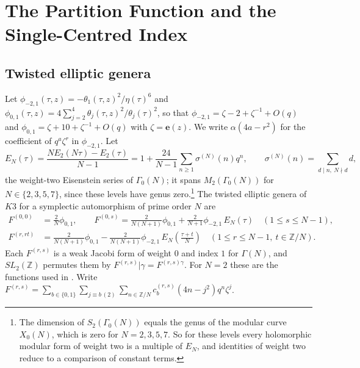 \documentclass[mathematics,article,submit,pdftex,oneauthor]{Definitions/mdpi}
\numberwithin{equation}{section}
\theoremstyle{plain}
\theoremstyle{remark}
\newcommand{\Z}{\mathbb{Z}}
\newcommand{\e}{\mathbf{e}}
\newcommand{\pmi}{\phi_{-2,1}}
\newcommand{\pz}{\phi_{0,1}}
\begin{document}
\section{The Partition Function and the Single-Centred Index}\label{sec:pf}

\subsection{Twisted elliptic genera}
Let $\phi_{-2,1}(\tau,z)=-\theta_1(\tau,z)^2/\eta(\tau)^6$ and $\pz(\tau,z)=4\sum_{j=2}^4\theta_j(\tau,z)^2/\theta_j(\tau)^2$, so that $\pmi=\zeta-2+\zeta^{-1}+O(q)$ and $\pz=\zeta+10+\zeta^{-1}+O(q)$ with $\zeta=\e(z)$. We write $\alpha(4a-r^2)$ for the coefficient of $q^a\zeta^r$ in $\pmi$. Let
\begin{equation}\label{eq:EN}
E_N(\tau)=\frac{NE_2(N\tau)-E_2(\tau)}{N-1}=1+\frac{24}{N-1}\sum_{n\ge1}\sigma^{(N)}(n)q^n,\qquad \sigma^{(N)}(n)=\sum_{d\mid n,\ N\nmid d}d,
\end{equation}
the weight-two Eisenstein series of $\Gamma_0(N)$; it spans $M_2(\Gamma_0(N))$ for $N\in\{2,3,5,7\}$, since these levels have genus zero.\footnote{The dimension of $S_2(\Gamma_0(N))$ equals the genus of the modular curve $X_0(N)$, which is zero for $N=2,3,5,7$. So for these levels every holomorphic modular form of weight two is a multiple of $E_N$, and identities of weight two reduce to a comparison of constant terms.}
The twisted elliptic genera of $K3$ for a symplectic automorphism of prime order $N$ are \cite{JS06,DJS06}
\begin{equation}\label{eq:genera}
\begin{aligned}
F^{(0,0)}&=\tfrac{2}{N}\pz,\qquad F^{(0,s)}=\tfrac{2}{N(N+1)}\pz+\tfrac{2}{N+1}\pmi\,E_N(\tau)\quad(1\le s\le N-1),\\
F^{(r,rt)}&=\tfrac{2}{N(N+1)}\pz-\tfrac{2}{N(N+1)}\pmi\,E_N\!\left(\tfrac{\tau+t}{N}\right)\quad(1\le r\le N-1,\ t\in\Z/N).
\end{aligned}
\end{equation}
Each $F^{(r,s)}$ is a weak Jacobi form of weight $0$ and index $1$ for $\Gamma(N)$, and $SL_2(\Z)$ permutes them by $F^{(r,s)}|\gamma=F^{(r,s)\gamma}$. For $N=2$ these are the functions used in \cite{Bha26a}. Write $F^{(r,s)}=\sum_{b\in\{0,1\}}\sum_{j\equiv b\,(2)}\sum_{n\in\Z/N}c_b^{(r,s)}(4n-j^2)q^n\zeta^j$.
\end{document}
